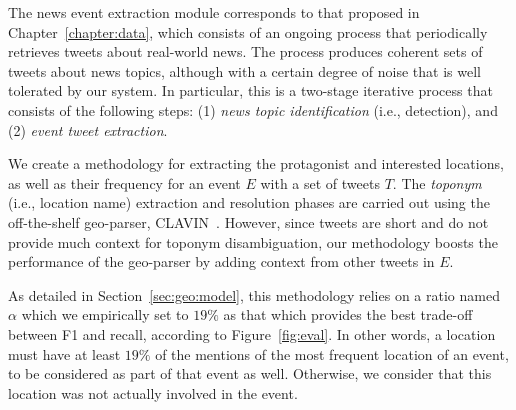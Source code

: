 %
The news event extraction module corresponds to that proposed in
Chapter~\ref{chapter:data}, which consists of an ongoing process that
periodically retrieves tweets about real-world news. 
%
The process produces coherent sets of tweets about news topics, although with a
certain degree of noise that is well tolerated by our system. 
%
In particular, this is a two-stage iterative process that consists of the
following steps:
%
(1) {\em news topic identification} (i.e., detection), and 
%
(2) {\em event tweet extraction}. 


\smallskip
{}
%
We create a methodology for extracting the protagonist and interested locations,
as well as their frequency for an event $E$ with a set of tweets $T$.  
%
The {\em toponym} (i.e., location name) extraction and resolution phases are
carried out using the off-the-shelf geo-parser, CLAVIN~\cite{clavin}. 
%
However, since tweets are short and do not provide much context for toponym
disambiguation, our methodology boosts the performance of the geo-parser by
adding context from other tweets in $E$.

As detailed in Section~\ref{sec:geo:model}, this methodology relies on a ratio
named $\alpha$ which we empirically set to $19\%$ as that which provides the
best trade-off between F1 and recall, according to Figure~\ref{fig:eval}. 
%
In other words, a location must have at least $19\%$ of the mentions of the most
frequent location of an event, to be considered as part of that event as well.
%
Otherwise, we consider that this location was not actually involved in the
event.